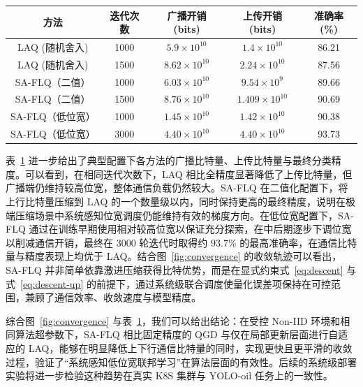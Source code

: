 \begin{table}[!htbp]
	\centering
	\label{tab:resource_comparison}
	\begin{tabular}{c|c|c|c|c}
		\hline
		方法 & 迭代次数 & 广播开销(bits) & 上传开销(bits) & 准确率(\%) \\
		\hline
		LAQ (随机舍入) & 1000 & $5.9 \times 10^{10}$   & $1.4 \times 10^{10}$   & 86.21 \\
		LAQ (随机舍入) & 1500 & $8.62 \times 10^{10}$  & $2.24 \times 10^{10}$  & 87.56 \\
		SA\mbox{-}FLQ（二值） & 1000 & $6.03 \times 10^{10}$  & $9.54 \times 10^{9}$   & 89.66 \\
		SA\mbox{-}FLQ（二值） & 1500 & $8.76 \times 10^{10}$  & $1.409 \times 10^{10}$ & 90.69 \\
		SA\mbox{-}FLQ（低位宽） & 1000 & $1.45 \times 10^{10}$  & $1.42 \times 10^{10}$  & 90.38 \\
		SA\mbox{-}FLQ（低位宽） & 3000 & $4.40 \times 10^{10}$  & $4.40 \times 10^{10}$  & 93.73 \\
		\hline
	\end{tabular}
\end{table}

表~\ref{tab:resource_comparison} 进一步给出了典型配置下各方法的广播比特量、上传比特量与最终分类精度。可以看到，在相同迭代次数下，LAQ 相比全精度显著降低了上传比特量，但广播端仍维持较高位宽，整体通信负载仍然较大。SA\mbox{-}FLQ 在二值化配置下，将上行比特量压缩到 LAQ 的一个数量级以内，同时保持更高的最终精度，说明在极端压缩场景中系统感知位宽调度仍能维持有效的梯度方向。在低位宽配置下，SA\mbox{-}FLQ 通过在训练早期使用相对较高位宽以保证充分探索，在中后期逐步下调位宽以削减通信开销，最终在 $3000$ 轮迭代时取得约 $93.7\%$ 的最高准确率，在通信比特量与精度表现上均优于 LAQ。结合图~\ref{fig:convergence} 的收敛轨迹可以看出，SA\mbox{-}FLQ 并非简单依靠激进压缩获得比特优势，而是在显式约束式~\eqref{eq:descent} 与式~\eqref{eq:descent-up} 的前提下，通过系统级联合调度使量化误差项保持在可控范围，兼顾了通信效率、收敛速度与模型精度。

综合图~\ref{fig:convergence} 与表~\ref{tab:resource_comparison}，我们可以给出结论：在受控 Non\mbox{-}IID 环境和相同算法超参数下，SA\mbox{-}FLQ 相比固定精度的 QGD 与仅在局部更新层面进行自适应的 LAQ，能够在明显降低上下行通信比特量的同时，实现更快且更平滑的收敛过程，验证了“系统感知低位宽联邦学习”在算法层面的有效性。后续的系统级部署实验将进一步检验这种趋势在真实 K8S 集群与 YOLO-oil 任务上的一致性。


